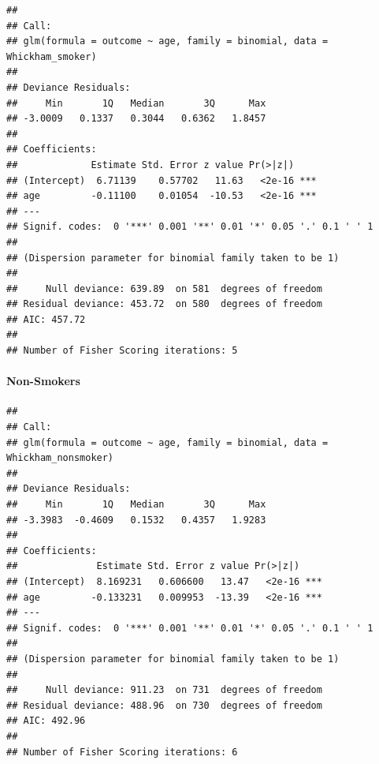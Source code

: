 \documentclass[]{article}
\newenvironment{Shaded}{\begin{snugshade}}{\end{snugshade}}
\newcommand{\DataTypeTok}[1]{\textcolor[rgb]{0.13,0.29,0.53}{#1}}
\newcommand{\KeywordTok}[1]{\textcolor[rgb]{0.13,0.29,0.53}{\textbf{#1}}}
\newcommand{\NormalTok}[1]{#1}
\newcommand{\OperatorTok}[1]{\textcolor[rgb]{0.81,0.36,0.00}{\textbf{#1}}}
\newcommand{\StringTok}[1]{\textcolor[rgb]{0.31,0.60,0.02}{#1}}
\let\oldparagraph\paragraph
\renewcommand{\paragraph}[1]{\oldparagraph{#1}\mbox{}}
\begin{document}
\begin{Shaded}
\end{Shaded}

\begin{verbatim}
## 
## Call:
## glm(formula = outcome ~ age, family = binomial, data = Whickham_smoker)
## 
## Deviance Residuals: 
##     Min       1Q   Median       3Q      Max  
## -3.0009   0.1337   0.3044   0.6362   1.8457  
## 
## Coefficients:
##             Estimate Std. Error z value Pr(>|z|)    
## (Intercept)  6.71139    0.57702   11.63   <2e-16 ***
## age         -0.11100    0.01054  -10.53   <2e-16 ***
## ---
## Signif. codes:  0 '***' 0.001 '**' 0.01 '*' 0.05 '.' 0.1 ' ' 1
## 
## (Dispersion parameter for binomial family taken to be 1)
## 
##     Null deviance: 639.89  on 581  degrees of freedom
## Residual deviance: 453.72  on 580  degrees of freedom
## AIC: 457.72
## 
## Number of Fisher Scoring iterations: 5
\end{verbatim}

\hypertarget{non-smokers}{%
\paragraph{Non-Smokers}\label{non-smokers}}

\begin{Shaded}
\end{Shaded}

\begin{verbatim}
## 
## Call:
## glm(formula = outcome ~ age, family = binomial, data = Whickham_nonsmoker)
## 
## Deviance Residuals: 
##     Min       1Q   Median       3Q      Max  
## -3.3983  -0.4609   0.1532   0.4357   1.9283  
## 
## Coefficients:
##              Estimate Std. Error z value Pr(>|z|)    
## (Intercept)  8.169231   0.606600   13.47   <2e-16 ***
## age         -0.133231   0.009953  -13.39   <2e-16 ***
## ---
## Signif. codes:  0 '***' 0.001 '**' 0.01 '*' 0.05 '.' 0.1 ' ' 1
## 
## (Dispersion parameter for binomial family taken to be 1)
## 
##     Null deviance: 911.23  on 731  degrees of freedom
## Residual deviance: 488.96  on 730  degrees of freedom
## AIC: 492.96
## 
## Number of Fisher Scoring iterations: 6
\end{verbatim}
\end{document}
